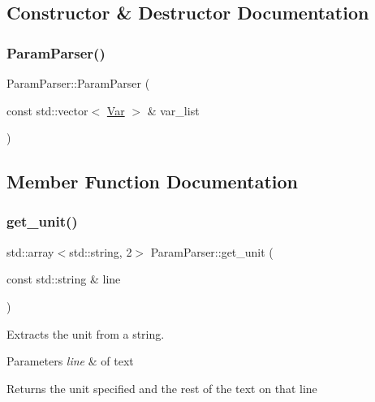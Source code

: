 \subsection{Constructor \& Destructor Documentation}
\mbox{\label{class_param_parser_a1acf0bbc9dd08f878c050d530e2407ce}} 
\subsubsection{\texorpdfstring{Param\+Parser()}{ParamParser()}}
{\footnotesize\ttfamily Param\+Parser\+::\+Param\+Parser (\begin{DoxyParamCaption}\item[{const std\+::vector$<$ \hyperlink{struct_var}{Var} $>$ \&}]{var\+\_\+list }\end{DoxyParamCaption})\hspace{0.3cm}{\ttfamily [inline]}}



\subsection{Member Function Documentation}
\mbox{\label{class_param_parser_a93452e252390edc07934ea08f5dce351}} 
\subsubsection{\texorpdfstring{get\+\_\+unit()}{get\_unit()}}
{\footnotesize\ttfamily std\+::array$<$std\+::string, 2$>$ Param\+Parser\+::get\+\_\+unit (\begin{DoxyParamCaption}\item[{const std\+::string \&}]{line }\end{DoxyParamCaption})}



Extracts the unit from a string. 


\begin{DoxyParams}{Parameters}
{\em line} & of text \\
\hline
\end{DoxyParams}
\begin{DoxyReturn}{Returns}
the unit specified and the rest of the text on that line 
\end{DoxyReturn}
\mbox{\label{class_param_parser_ad55f29f701b36351486e4afb8a70b338}} 
